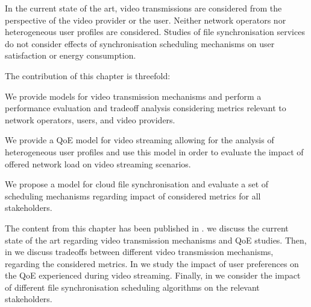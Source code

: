 In the current state of the art, video transmissions are considered from the perspective of the video provider or the user. 
Neither network operators nor heterogeneous user profiles are considered.
Studies of file synchronisation services do not consider effects of synchronisation scheduling mechanisms on user satisfaction or energy consumption.  

The contribution of this chapter is threefold:
\begin{enumerate*}
\item We provide models for video transmission mechanisms and perform a performance evaluation and tradeoff analysis considering metrics relevant to network operators, users, and video providers.
\item We provide a \gls{QoE} model for video streaming allowing for the analysis of heterogeneous user profiles and use this model in order to evaluate the impact of offered network load on video streaming scenarios.
\item We propose a model for cloud file synchronisation and evaluate a set of scheduling mechanisms regarding impact of considered metrics for all stakeholders.
\end{enumerate*}

The content from this chapter has been published in \cite{Schwartz2013b, Hossfeld2015, Schwartz2014a}.
 we discuss the current state of the art regarding video transmission mechanisms and \gls{QoE} studies.
Then, in  we discuss tradeoffs between different video transmission mechanisms, regarding the considered metrics.
In  we study the impact of user preferences on the \gls{QoE} experienced during video streaming.
Finally, in  we consider the impact of different file synchronisation scheduling algorithms on the relevant stakeholders.





